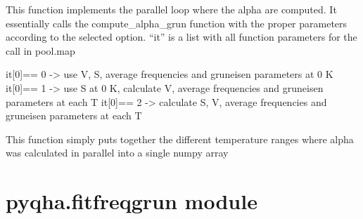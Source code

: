 \documentclass[letterpaper,10pt,english]{sphinxmanual}
\begin{document}

\begin{fulllineitems}
\label{pyqha:pyqha.alphagruneisenp.compute_alpha_gruneisen_loopparallel}
This function implements the parallel loop where the alpha are computed. It  
essentially calls the compute\_alpha\_grun function with the proper parameters
according to the selected option. ``it'' is a list with all function parameters
for the call in pool.map

it{[}0{]}== 0 -\textgreater{} use V, S, average frequencies and gruneisen parameters at 0 K 
it{[}0{]}== 1 -\textgreater{} use S at 0 K, calculate V, average frequencies and gruneisen parameters at each T 
it{[}0{]}== 2 -\textgreater{}  calculate S, V, average frequencies and gruneisen parameters at each T

\end{fulllineitems}


\begin{fulllineitems}
\label{pyqha:pyqha.alphagruneisenp.join}
This function simply puts together the different temperature ranges where alpha
was calculated in parallel into a single numpy array

\end{fulllineitems}



\section{pyqha.fitfreqgrun module}
\label{pyqha:pyqha-fitfreqgrun-module}\label{pyqha:module-pyqha.fitfreqgrun}
\end{document}
